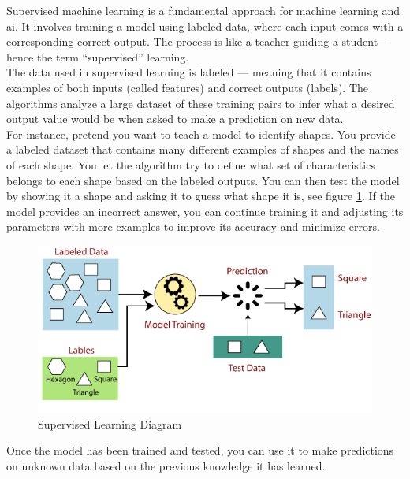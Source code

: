 Supervised machine learning is a fundamental approach for machine learning and \gls{ai}. It involves training a model using labeled data, where each input comes with a corresponding correct output. The process is like a teacher guiding a student—hence the term “supervised” learning. \cite{geeksforgeeks:supervised-learning} \\

The data used in supervised learning is labeled — meaning that it contains examples of both inputs (called features) and correct outputs (labels). The algorithms analyze a large dataset of these training pairs to infer what a desired output value would be when asked to make a prediction on new data. \cite{google:supervised-learning} \\

For instance, pretend you want to teach a model to identify shapes. You provide a labeled dataset that contains many different examples of shapes and the names of each shape. You let the algorithm try to define what set of characteristics belongs to each shape based on the labeled outputs. You can then test the model by showing it a shape and asking it to guess what shape it is, see figure \ref{fig:supervised-learning}. If the model provides an incorrect answer, you can continue training it and adjusting its parameters with more examples to improve its accuracy and minimize errors. \cite{google:supervised-learning} \\ 

\begin{figure}[h!]
    \centering
    \includegraphics[width=0.75\linewidth]{figures/theory/supervised-learning.png}
    \caption{Supervised Learning Diagram \cite{tpointtech:supervised-learning}}
    \label{fig:supervised-learning}
\end{figure}

Once the model has been trained and tested, you can use it to make predictions on unknown data based on the previous knowledge it has learned. \cite{google:supervised-learning}

